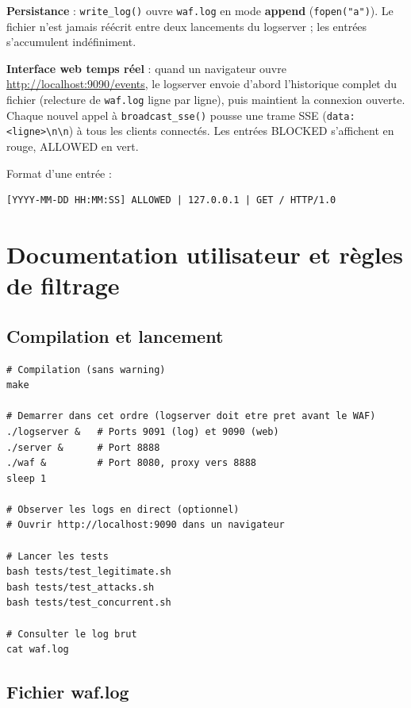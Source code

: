 \documentclass[12pt,a4paper]{article}
\begin{document}
\textbf{Persistance} : \texttt{write\_log()} ouvre \texttt{waf.log} en mode \textbf{append} (\texttt{fopen("a")}). Le fichier n'est jamais réécrit entre deux lancements du logserver ; les entrées s'accumulent indéfiniment.

\textbf{Interface web temps réel} : quand un navigateur ouvre \url{http://localhost:9090/events}, le logserver envoie d'abord l'historique complet du fichier (relecture de \texttt{waf.log} ligne par ligne), puis maintient la connexion ouverte. Chaque nouvel appel à \texttt{broadcast\_sse()} pousse une trame SSE (\texttt{data: <ligne>\textbackslash n\textbackslash n}) à tous les clients connectés. Les entrées BLOCKED s'affichent en rouge, ALLOWED en vert.

Format d'une entrée :

\begin{lstlisting}[style=monospace]
[YYYY-MM-DD HH:MM:SS] ALLOWED | 127.0.0.1 | GET / HTTP/1.0
\end{lstlisting}

\section{Documentation utilisateur et règles de filtrage}

\subsection{Compilation et lancement}

\begin{lstlisting}[style=bash]
# Compilation (sans warning)
make

# Demarrer dans cet ordre (logserver doit etre pret avant le WAF)
./logserver &   # Ports 9091 (log) et 9090 (web)
./server &      # Port 8888
./waf &         # Port 8080, proxy vers 8888
sleep 1

# Observer les logs en direct (optionnel)
# Ouvrir http://localhost:9090 dans un navigateur

# Lancer les tests
bash tests/test_legitimate.sh
bash tests/test_attacks.sh
bash tests/test_concurrent.sh

# Consulter le log brut
cat waf.log
\end{lstlisting}

\subsection{Fichier waf.log}
\end{document}
